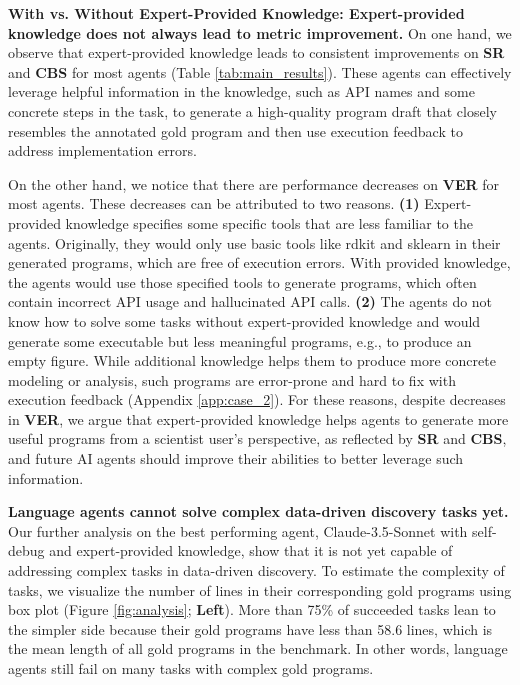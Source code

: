 \documentclass{article} %
\begin{document}
%
\textbf{With vs. Without Expert-Provided Knowledge: Expert-provided knowledge does not always lead to metric improvement.}
On one hand, we observe that expert-provided knowledge leads to consistent improvements on \textbf{SR} and \textbf{CBS} for most agents (Table \ref{tab:main_results}).
These agents can effectively leverage helpful information in the knowledge, such as API names and some concrete steps in the task, to generate a high-quality program draft that closely resembles the annotated gold program and then use execution feedback to address implementation errors.
%

%
On the other hand, we notice that there are performance decreases on \textbf{VER} for most agents.
These decreases can be attributed to two reasons.
\textbf{(1)} Expert-provided knowledge specifies some specific tools that are less familiar to the agents.
Originally, they would only use basic tools like rdkit and sklearn in their generated programs, which are free of execution errors.
With provided knowledge, the agents would use those specified tools to generate programs, which often contain incorrect API usage and hallucinated API calls.
\textbf{(2)} The agents do not know how to solve some tasks without expert-provided knowledge and would generate some executable but less meaningful programs, e.g., to produce an empty figure. 
While additional knowledge helps them to produce more concrete modeling or analysis, such programs are error-prone and hard to fix with execution feedback (Appendix \ref{app:case_2}). 
For these reasons, despite decreases in \textbf{VER}, we argue that expert-provided knowledge helps agents to generate more useful programs from a scientist user's perspective, as reflected by \textbf{SR} and \textbf{CBS}, and future AI agents should improve their abilities to better leverage such information. 
%



%
\textbf{Language agents cannot solve complex data-driven discovery tasks yet.}
Our further analysis on the best performing agent, Claude-3.5-Sonnet with self-debug and expert-provided knowledge, show that it is not yet capable of addressing complex tasks in data-driven discovery.
To estimate the complexity of tasks, we visualize the number of lines in their corresponding gold programs using box plot (Figure \ref{fig:analysis}; \textbf{Left}).
More than 75\% of succeeded tasks lean to the simpler side because their gold programs have less than 58.6 lines, which is the mean length of all gold programs in the benchmark.
In other words, language agents still fail on many tasks with complex gold programs.
%
\end{document}

